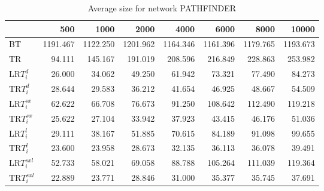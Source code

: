 \begin{table}
\begin{center}
\begin{tabular}{lrrrrrrr}
 & 500 & 1000 & 2000 & 4000 & 6000 & 8000 & 10000\\\hline
BT & 1191.467 & 1122.250 & 1201.962 & 1164.346 & 1161.396 & 1179.765 & 1193.673\\\hline
TR & 94.111 & 145.167 & 191.019 & 208.596 & 216.849 & 228.863 & 253.982\\\hline
LR$T_i^d$ & 26.000 & 34.062 & 49.250 & 61.942 & 73.321 & 77.490 & 84.273\\\hline
TR$T_i^d$ & 28.644 & 29.583 & 36.212 & 41.654 & 46.925 & 48.667 & 54.509\\\hline
LR$T_i^{sx}$ & 62.622 & 66.708 & 76.673 & 91.250 & 108.642 & 112.490 & 119.218\\\hline
TR$T_i^{sx}$ & 25.622 & 27.104 & 33.942 & 37.923 & 43.415 & 46.176 & 51.036\\\hline
LR$T_i^l$ & 29.111 & 38.167 & 51.885 & 70.615 & 84.189 & 91.098 & 99.655\\\hline
TR$T_i^l$ & 23.600 & 23.958 & 28.673 & 32.135 & 36.113 & 36.078 & 39.491\\\hline
LR$T_i^{sxl}$ & 52.733 & 58.021 & 69.058 & 88.788 & 105.264 & 111.039 & 119.364\\\hline
TR$T_i^{sxl}$ & 22.889 & 23.771 & 28.846 & 31.000 & 35.377 & 35.745 & 37.691\\\hline
\end{tabular}
\end{center}
\caption{Average size for network PATHFINDER }
\label{Pathfindersi}
\end{table}


